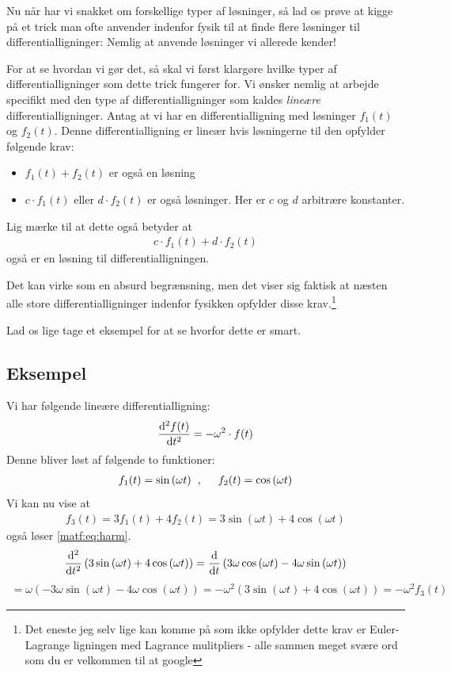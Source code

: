 \documentclass[crop=false, class=memoir]{standalone}
\begin{document}
Nu når har vi snakket om forskellige typer af løsninger, så lad os prøve at kigge på et trick man ofte anvender indenfor fysik til at finde flere løsninger til differentialligninger: Nemlig at anvende løsninger vi allerede kender!

For at se hvordan vi gør det, så skal vi først klargøre hvilke typer af differentialligninger som dette trick fungerer for. Vi ønsker nemlig at arbejde specifikt med den type af differentialligninger som kaldes \emph{lineære} differentialligninger. Antag at vi har en differentialligning med løsninger $f_1(t)$ og $f_2(t)$. Denne differentialligning er lineær hvis løsningerne til den opfylder følgende krav:
\begin{itemize}
    \item  $f_1(t) + f_2(t)$ er også en løsning
    \item  $c \cdot f_1(t)$ eller $d \cdot f_2(t)$ er            også løsninger. Her er $c$ og $d$                arbitrære konstanter.  
\end{itemize}
Lig mærke til at dette også betyder at
\begin{align}
    c \cdot f_1(t) + d \cdot f_2(t)
    \label{matf:eq:lincomb}
\end{align}
også er en løsning til differentialligningen.

Det kan virke som en absurd begrænsning, men det viser sig faktisk at næsten alle store differentialligninger indenfor fysikken opfylder disse krav.\footnote{Det eneste jeg selv lige kan komme på som ikke opfylder dette krav er Euler-Lagrange ligningen med Lagrance mulitpliers - alle sammen meget svære ord som du er velkommen til at google}

Lad os lige tage et eksempel for at se hvorfor dette er smart.

\subsection{Eksempel}

Vi har følgende lineære differentialligning:
\begin{align}
    \dv[2]{f(t)}{t} = -\omega^2 \cdot f(t)
    \label{matf:eq:harm}
\end{align}
Denne bliver løst af følgende to funktioner:
\begin{align}
    f_1 (t) = \sin{(\omega t)}\hspace{2mm}, \hspace{5mm} f_2 (t) = \cos{(\omega t)}
\end{align}
Vi kan nu vise at
\begin{align}
    f_3 (t) = 3 f_1 (t) + 4 f_2 (t) = 3\sin{(\omega t)} + 4\cos{(\omega t)}
\end{align}
også løser \cref{matf:eq:harm}. 
\begin{align}
    \dv[2]{}{t} \left( 3\sin{(\omega t)} + 4\cos{(\omega t)} \right) = \dv{}{t} \left( 3\omega\cos{(\omega t)} - 4 \omega \sin{(\omega t)} \right)
\end{align}
\begin{align}
   = \omega \left( - 3\omega\sin{(\omega t)} - 4 \omega \cos{(\omega t)} \right) = -\omega^2 \left( 3\sin{(\omega t)} + 4\cos{(\omega t)} \right) = -\omega^2 f_3 (t)
\end{align}
\end{document}
